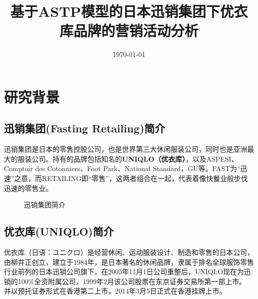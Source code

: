 \documentclass{xjtureport}
\title{基于ASTP模型的日本迅销集团下优衣库品牌的营销活动分析}
\date{\today}
\begin{document}
\makecover
{}

\thispagestyle{fancy}

\rfoot{\thepage}
\tableofcontents
\clearpage
\section{研究背景}
\subsection{迅销集团(Fasting Retailing)简介}
迅销集团\cite{ref1}是日本的零售控股公司，也是世界第三大休闲服装公司，同时也是亚洲最大的服装公司。持有的品牌包括知名的\textbf{UNIQLO（优衣库）}，以及ASPESI、Comptoir des Cotonniers、Foot Park、National Standard，GU等。FAST为“迅速”之意，而RETAILING即“零售”，这两者组合在一起，代表着像快餐业般步伐迅速的零售业。
\begin{figure}[H]
    \centering
    \caption{迅销集团简介}
\end{figure}
\subsection{优衣库(UNIQLO)简介}
优衣库（日语：ユニクロ）是经营休闲、运动服装设计、制造和零售的日本公司，由柳井正创立，建立于1984年，是日本著名的休闲品牌，隶属于排名全球服饰零售行业前列的日本迅销公司旗下，在2005年11月1日公司重整后，UNIQLO现在为迅销的100\%全资附属公司，1999年2月该公司股票在东京证券交易所第一部上市\cite{ref2}。 并以预托证券形式在香港第二上市，2014年3月5日正式在香港挂牌上市。


\end{document}
